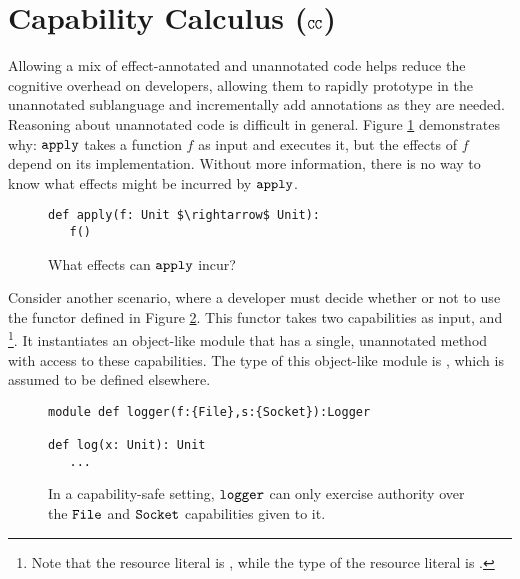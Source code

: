 \vspace{-0.3cm}
\section{Capability Calculus ($\mathtt{CC}$)}
\vspace{-0.3cm}
\label{s:cc}

Allowing a mix of effect-annotated and unannotated code helps
reduce the cognitive overhead on developers, allowing them to rapidly
prototype in the unannotated sublanguage and incrementally add
annotations as they are needed. Reasoning about unannotated code is
difficult in general. Figure \ref{fig:unannotated_reasoning}
demonstrates why: $\mathtt{apply}$ takes a function $f$ as input and
executes it, but the effects of $f$ depend on its
implementation. Without more information, there is no way to know what
effects might be incurred by $\mathtt{apply}$.

\begin{figure}
\vspace{-0.8cm}
\begin{lstlisting}
def apply(f: Unit $\rightarrow$ Unit):
   f()
\end{lstlisting}
\vspace{-0.5cm}
\caption{What effects can $\mathtt{apply}$ incur?}
\vspace{-0.5cm}
\label{fig:unannotated_reasoning}
\end{figure}

Consider another scenario, where a developer must decide whether or not
to use the  functor defined in Figure \ref{fig:cc_motivation}. This
functor takes two capabilities as input,  and \footnote{Note that the resource literal is , while the type of the resource literal is
.}. It instantiates an object-like module that has a single, unannotated  method with access to these capabilities. The type of this object-like module is , which is assumed to be defined elsewhere.

\begin{figure}
\vspace{-0.8cm}
\begin{lstlisting}
module def logger(f:{File},s:{Socket}):Logger

def log(x: Unit): Unit
   ...
\end{lstlisting}
\vspace{-0.5cm}
\caption{In a capability-safe setting, $\mathtt{logger}$ can only exercise authority over the $\mathtt{File}$ and $\mathtt{Socket}$ capabilities given to it.}
\vspace{-0.5cm}
\label{fig:cc_motivation}
\end{figure}

